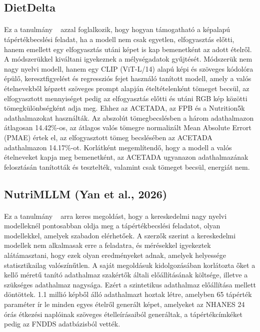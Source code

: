 \subsection{DietDelta}
\paragraph{}Ez a tanulmány ~\cite{vinod2026dietdelta} azzal foglalkozik, hogy hogyan támogatható a képalapú tápértékbecslési feladat, ha a modell nem csak egyetlen, elfogyasztás előtti, hanem emellett egy elfogyasztás utáni képet is kap bemenetként az adott ételről. A módszerükkel kiváltani igyekeznek a mélységadatok gyűjtését. Módszerük nem nagy nyelvi modell, hanem egy CLIP (ViT-L/14) alapú képi és szöveges kódolóra épülő, keresztfigyelést és regressziós fejet használó tanított modell, amely a valós ételnevekből képzett szöveges prompt alapján ételtételenként tömeget becsül, az elfogyasztott mennyiséget pedig az elfogyasztás előtti és utáni RGB kép közötti tömegkülönbségként adja meg.
Ehhez az ACETADA, az FPB és a Nutrition5k adathalmazokat használták. Az abszolút tömegbecslésben a három adathalmazon átlagosan 14.42\%-os, az átlagos valós tömegre normalizált Mean Absolute Errort (PMAE) értek el, az elfogyasztott tömeg becslésében az ACETADA adathalmazon 14.17\%-ot.
Korlátként megemlítendő, hogy a modell a valós ételneveket kapja meg bemenetként, az ACETADA ugyanazon adathalmazának felosztásán tanították és tesztelték, valamint csak tömeget becsül, energiát nem.


\subsection{NutriMLLM (Yan et al., 2026)}
\paragraph{}Ez a tanulmány ~\cite{yan2026nutrimllm} arra keres megoldást, hogy a kereskedelmi nagy nyelvi modelleknél pontosabban oldja meg a tápértékbecslési feladatot, olyan modellekkel, amelyek szabadon elérhetőek. A szerzők szerint a kereskedelmi modellek nem alkalmasak erre a feladatra, és mérésekkel igyekeztek alátámasztani, hogy ezek olyan eredményeket adnak, amelyek helyessége statisztikailag valószínűtlen. A saját megoldásuk kidolgozásában korlátozta őket a kellő méretű tanító adathalmaz szakértők általi előállításának költsége, illetve a szükséges adathalmaz nagysága. Ezért a szintetikus adathalmaz előállítása mellett döntöttek. 1.1 millió képből álló adathalmazt hoztak létre, amelyben 65 tápérték paraméter ír le minden egyes ételről generált képet, amelyeket az NHANES 24 órás étkezési naplóinak szöveges ételleírásaiból generáltak, a tápértékcímkéket pedig az FNDDS adatbázisból vették.


